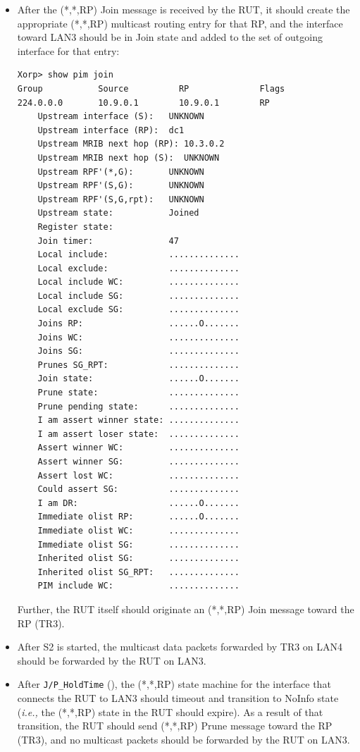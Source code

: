 \documentclass[11pt]{report}
\newcommand{\ie}{\emph{i.e.,}\xspace}
\begin{document}
\begin{itemize}

  \item After the (*,*,RP) Join message is received by the RUT, it
  should create the appropriate (*,*,RP) multicast routing entry for
  that RP, and the interface toward LAN3 should be in Join state and
  added to the set of outgoing interface for that entry:

\begin{verbatim}
Xorp> show pim join 
Group           Source          RP              Flags
224.0.0.0       10.9.0.1        10.9.0.1        RP   
    Upstream interface (S):   UNKNOWN
    Upstream interface (RP):  dc1
    Upstream MRIB next hop (RP): 10.3.0.2
    Upstream MRIB next hop (S):  UNKNOWN
    Upstream RPF'(*,G):       UNKNOWN
    Upstream RPF'(S,G):       UNKNOWN
    Upstream RPF'(S,G,rpt):   UNKNOWN
    Upstream state:           Joined 
    Register state:           
    Join timer:               47
    Local include:            ..............
    Local exclude:            ..............
    Local include WC:         ..............
    Local include SG:         ..............
    Local exclude SG:         ..............
    Joins RP:                 ......O.......
    Joins WC:                 ..............
    Joins SG:                 ..............
    Prunes SG_RPT:            ..............
    Join state:               ......O.......
    Prune state:              ..............
    Prune pending state:      ..............
    I am assert winner state: ..............
    I am assert loser state:  ..............
    Assert winner WC:         ..............
    Assert winner SG:         ..............
    Assert lost WC:           ..............
    Could assert SG:          ..............
    I am DR:                  ......O.......
    Immediate olist RP:       ......O.......
    Immediate olist WC:       ..............
    Immediate olist SG:       ..............
    Inherited olist SG:       ..............
    Inherited olist SG_RPT:   ..............
    PIM include WC:           ..............
\end{verbatim}

  Further, the RUT itself should originate an (*,*,RP) Join message
  toward the RP (TR3).

  \item After S2 is started, the multicast data packets forwarded by TR3
  on LAN4 should be forwarded by the RUT on LAN3.

  \item After \verb=J/P_HoldTime= ({\PimsmJPHoldTime}),
  the (*,*,RP) state machine for the interface that connects the RUT to
  LAN3 should timeout and transition to NoInfo state
  (\ie the (*,*,RP) state in the RUT should expire).
  As a result of that transition, the RUT should send (*,*,RP) Prune
  message toward the RP (TR3), and no multicast packets should be
  forwarded by the RUT on LAN3.

\end{itemize}
\end{document}
